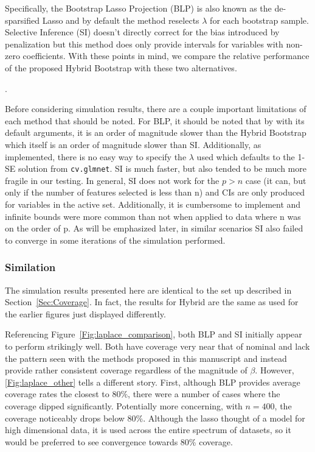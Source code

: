 Specifically, the Bootstrap Lasso Projection (BLP) is also known as the de-sparsified Lasso and by default the method reselects $\lambda$ for each bootstrap sample. Selective Inference (SI) doesn't directly correct for the bias introduced by penalization but this method does only provide intervals for variables with non-zero coefficients. With these points in mind, we compare the relative performance of the proposed Hybrid Bootstrap with these two alternatives.

.

Before considering simulation results, there are a couple important limitations of each method that should be noted. For BLP, it should be noted that by with its default arguments, it is an order of magnitude slower than the Hybrid Bootstrap which itself is an order of magnitude slower than SI. Additionally, as implemented, there is no easy way to specify the $\lambda$ used which defaults to the 1-SE solution from \texttt{cv.glmnet}. SI is much faster, but also tended to be much more fragile in our testing. In general, SI does not work for the $p > n$ case (it can, but only if the number of features selected is less than n) and CIs are only produced for variables in the active set. Additionally, it is cumbersome to implement and infinite bounds were more common than not when applied to data where n was on the order of p. As will be emphasized later, in similar scenarios SI also failed to converge in some iterations of the simulation performed. 

\subsubsection{Similation}

The simulation results presented here are identical to the set up described in Section~\ref{Sec:Coverage}. In fact, the results for Hybrid are the same as used for the earlier figures just displayed differently. 

Referencing Figure~\ref{Fig:laplace_comparison}, both BLP and SI initially appear to perform strikingly well. Both have coverage very near that of nominal and lack the pattern seen with the methods proposed in this manuscript and instead provide rather consistent coverage regardless of the magnitude of $\beta$. However, \ref{Fig:laplace_other} tells a different story. First, although BLP provides average coverage rates the closest to $80\%$, there were a number of cases where the coverage dipped significantly. Potentially more concerning, with $n = 400$, the coverage noticeably drops below 80\%. Although the lasso thought of a model for high dimensional data, it is used across the entire spectrum of datasets, so it would be preferred to see convergence towards 80\% coverage.

